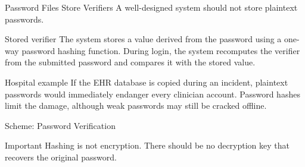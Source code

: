 \documentclass[presentation]{beamer}
\begin{document}
\begin{frame}[c]{Password Files Store Verifiers}
  A well-designed system should not store plaintext passwords.

  \begin{block}{Stored verifier}
    The system stores a value derived from the password using a one-way password hashing function. During login, the system recomputes the verifier from the submitted password and compares it with the stored value.
  \end{block}

  \begin{exampleblock}{Hospital example}
    If the EHR database is copied during an incident, plaintext passwords would immediately endanger every clinician account. Password hashes limit the damage, although weak passwords may still be cracked offline.
  \end{exampleblock}
\end{frame}

\begin{frame}[c]{Scheme: Password Verification}
  \begin{center}
  \end{center}

  \vspace{0.5cm}
  \begin{block}{Important}
    Hashing is not encryption. There should be no decryption key that recovers the original password.
  \end{block}
\end{frame}
\end{document}
